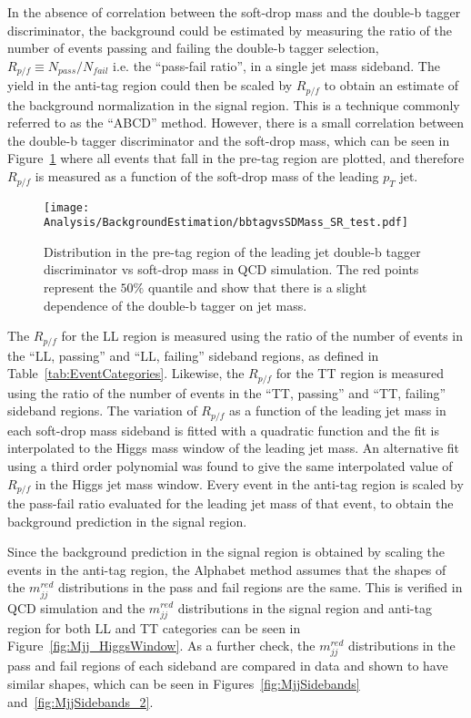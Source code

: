 In the absence of correlation between the soft-drop mass and the double-b tagger discriminator, the background could be estimated by measuring the ratio of the number of events passing and failing the double-b tagger selection, $R_{p/f}\equiv N_{pass}/N_{fail}$ i.e. the ``pass-fail ratio'', in a single jet mass sideband. The yield in the anti-tag region could then be scaled by $R_{p/f}$ to obtain an estimate of the background normalization in the signal region. This is a technique commonly referred to as the ``ABCD'' method. However, there is a small correlation between the double-b tagger discriminator and the soft-drop mass, which can be seen in Figure~\ref{fig:twotone2} where all events that fall in the pre-tag region are plotted, and therefore $R_{p/f}$ is measured as a function of the soft-drop mass of the leading $p_{T}$ jet. 

\begin{figure}[h!]
  \centering
    \texttt{[image: Analysis/BackgroundEstimation/bbtagvsSDMass\_SR\_test.pdf]}
  \caption{Distribution in the pre-tag region of the leading jet double-b tagger discriminator vs soft-drop mass in QCD simulation. The red points represent the $50\%$ quantile and show that there is a slight dependence of the double-b tagger on jet mass.} \label{fig:twotone2}
\end{figure}

The $R_{p/f}$ for the LL region is measured using the ratio of the number of events in the ``LL, passing'' and ``LL, failing'' sideband regions, as defined in Table~\ref{tab:EventCategories}. Likewise, the $R_{p/f}$ for the TT region is measured using the ratio of the number of events in the ``TT, passing'' and ``TT, failing'' sideband regions. The variation of $R_{p/f}$ as a function of the leading jet mass in each soft-drop mass sideband is fitted with a quadratic function and the fit is interpolated to the Higgs mass window of the leading jet mass. An alternative fit using a third order polynomial was found to give the same interpolated value of $R_{p/f}$ in the Higgs jet mass window. Every event in the anti-tag region is scaled by the pass-fail ratio evaluated for the leading jet mass of that event, to obtain the background prediction in the signal region.

Since the background prediction in the signal region is obtained by scaling the events in the anti-tag region, the Alphabet method assumes that the shapes of the $m_{jj}^{red}$ distributions in the pass and fail regions are the same. This is verified in QCD simulation and the $m_{jj}^{red}$ distributions in the signal region and anti-tag region for both LL and TT categories can be seen in Figure~\ref{fig:Mjj_HiggsWindow}. As a further check, the $m_{jj}^{red}$ distributions in the pass and fail regions of each sideband are compared in data and shown to have similar shapes, which can be seen in Figures~\ref{fig:MjjSidebands} and~\ref{fig:MjjSidebands_2}.

